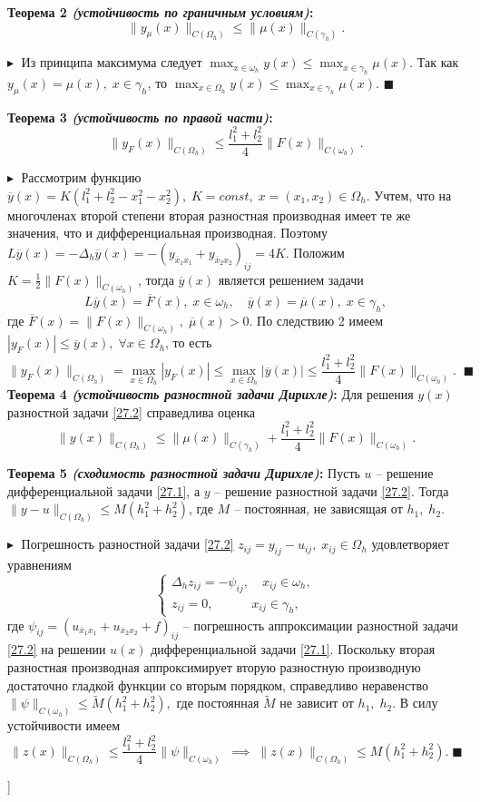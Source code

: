 \textbf{Теорема 2 \textit{(устойчивость по граничным условиям)}:}
$$\|y_\mu (x)\|_{C(\Omega_h)} \leq \|\mu(x)\|_{C(\gamma_h)}.$$

$\blacktriangleright\;$ Из принципа максимума следует $ \max_{x\in\omega_h} y(x) \leq \max_{x\in\gamma_h} \mu(x)$. Так как $y_\mu(x) = \mu(x),\;x\in\gamma_h$, то $ \max_{x\in\Omega_h} y(x) \leq \max_{x\in\gamma_h} \mu(x)$.\; $\blacksquare$

\textbf{Теорема 3 \textit{(устойчивость по правой части)}:}
$$\|y_F(x)\|_{C(\Omega_h)} \leq \frac{l_1^2 + l_2^2}{4} \|F(x)\|_{C(\omega_h)}.$$

$\blacktriangleright\;$ Рассмотрим функцию $\overline{y}(x) = K(l_1^2 + l_2^2 - x_1^2 - x_2^2),\; K= const, \; x = (x_1, x_2) \in \Omega_h$. Учтем, что на многочленах второй степени вторая разностная производная имеет те же значения, что и дифференциальная производная.
Поэтому $L \overline{y}(x) = - \Delta_h \overline{y}(x) = -(y_{\overline{x}_1x_1} + y_{\overline{x}_2x_2})_{ij} = 4K$. Положим $K = \frac{1}{2}\|F(x)\|_{C(\omega_h)}$, тогда $\overline{y}(x)$ является решением задачи
$$
L\overline{y}(x) = \overline{F}(x), \; x\in \omega_h, \quad \overline{y}(x) = \overline{\mu}(x),\; x\in \gamma_h,
$$
где $\overline{F}(x) = \|F(x)\|_{C(\omega_h)}, \; \overline{\mu}(x) > 0$. По следствию 2 имеем $|y_F(x)| \leq \overline{y}(x), \;\forall x \in \Omega_h$, то есть
$$
\|y_F(x)\|_{C(\Omega_h)} = \max_{x\in\Omega_h} |y_F(x)| \leq \max_{x\in\Omega_h} |\overline{y}(x)| \leq   \frac{l_1^2 + l_2^2}{4} \|F(x)\|_{C(\omega_h)}. \;\;\blacksquare
$$
\textbf{Теорема 4 \textit{(устойчивость разностной задачи Дирихле)}:} \; Для решения $y(x)$ разностной задачи \eqref{27.2} справедлива оценка
$$
\|y(x)\|_{C(\Omega_h)} \leq \|\mu(x)\|_{C(\gamma_h)} + \frac{l_1^2 + l_2^2}{4} \|F(x)\|_{C(\omega_h)}.
$$

\textbf{Теорема 5 \textit{(сходимость разностной задачи Дирихле)}:}\; Пусть $u$ -- решение дифференциальной задачи \eqref{27.1}, а $y$ -- решение разностной задачи \eqref{27.2}. Тогда $\|y - u\|_{C(\Omega_h)} \leq M(h_1^2 + h_2^2)$, где $M$ -- постоянная, не зависящая от $h_1, \; h_2$.

$\blacktriangleright\;$ Погрешность разностной задачи \eqref{27.2} $z_{ij} = y_{ij} - u_{ij}, \; x_{ij} \in \Omega_h$ удовлетворяет уравнениям
$$
\begin{cases}
    \Delta_h z_{ij} = - \psi_{ij}, \quad x_{ij} \in \omega_h,\\
    z_{ij} = 0, \qquad\quad x_{ij} \in \gamma_h,
\end{cases}
$$
где $\psi_{ij} = (u_{\overline{x}_1x_1} + u_{\overline{x}_2x_2} + f)_{ij}$ -- погрешность аппроксимации разностной задачи \eqref{27.2} на решении $u(x)$ дифференциальной задачи \eqref{27.1}. Поскольку вторая разностная производная аппроксимирует вторую разностную производную достаточно гладкой функции со вторым порядком, справедливо неравенство
$
\|\psi\|_{C(\omega_h)} \leq \widetilde{M}(h_1^2 + h_2^2),
$
где постоянная $\widetilde{M}$ не зависит от $h_1, \;h_2$. В силу устойчивости имеем
$$
\|z(x)\|_{C(\Omega_h)} \leq \frac{l_1^2 + l_2^2}{4} \|\psi\|_{C(\omega_h)} \;\implies \;
\|z(x)\|_{C(\Omega_h)} \leq M(h_1^2 + h_2^2). \; \blacksquare
$$


\bigbreak
[\cite[pages 32-41]{chmmf}]
